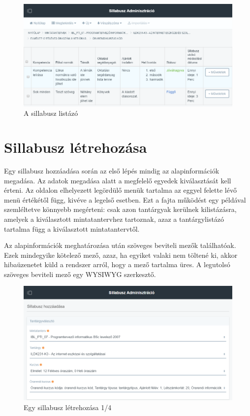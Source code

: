 \documentclass[hidelinks, 12pt, a4paper]{report}
\begin{document}
\begin{figure}[H]
    \centering
	\includegraphics[width=\textwidth]{sm_syllabus_list.png}
	\caption{A sillabusz listázó}
\end{figure}

\section{Sillabusz létrehozása}

Egy sillabusz hozzáadása során az első lépés mindig az alapinformációk megadása. Az adatok megadása alatt a megfelelő egyedek kiválasztását kell érteni. Az oldalon elhelyezett legördülő menük tartalma az eggyel felette lévő menü értékétől függ, kivéve a legelső esetben. Ezt a fajta működést egy példával szemléltetve könnyebb megérteni: csak azon tantárgyak kerülnek kilistázásra, amelyek a kiválasztott mintatantervhez tartoznak, azaz a tantárgylistázó tartalma függ a kiválasztott mintatantervtől.

Az alapinformációk meghatározása után szöveges beviteli mezők találhatóak. Ezek mindegyike kötelező mező, azaz, ha egyiket valaki nem töltené ki, akkor hibaüzenetet küld a rendszer arról, hogy a mező tartalma üres. A legutolsó szöveges beviteli mező egy WYSIWYG szerkesztő.

\begin{figure}[H]
    \centering
	\includegraphics[width=\textwidth]{sm_syllabus_add_1.png}
	\caption{Egy sillabusz létrehozása 1/4}
\end{figure}
\end{document}
